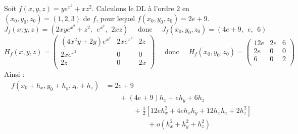 \begin{exemple}
Soit $f(x,y,z) = ye^{x^2} + xz^2$. Calculons le DL à l'ordre $2$ en $(x_0,y_0,z_0) = (1,2,3)$ de $f$, pour lequel $f(x_0,y_0,z_0) = 2e + 9$.
$$J_f (x,y,z) = \left(2xye^{x^2} + z^2,\ \  e^{x^2},\ \  2xz \right)
\quad \text{ donc } \quad
J_f (x_0,y_0,z_0) = \left(4e + 9,\ \  e,\ \ 6 \right)$$
$$H_f(x,y,z)=
\begin{pmatrix}
(4x^2y+2y) e^{x^2} & 2xe^{x^2} & 2z \\
2xe^{x^2} &  0 & 0\\
2z &  0 & 2x \\
\end{pmatrix}
\quad \text{ donc } \quad
H_f(x_0,y_0,z_0)=
\begin{pmatrix}
12e & 2e & 6 \\
2e &  0 & 0\\
6 &  0 & 2\\
\end{pmatrix}$$
Ainsi :
\begin{align*}
f(x_0+h_x,y_0+h_y,z_0+h_z) 
& =2e + 9 \\
& \qquad +  (4e+9)h_x +  eh_y + 6h_z \\
& \qquad\qquad + \frac{1}{2}\left[ 12e h_x^2 + 4eh_xh_y +12h_xh_z +2h_z^2 \right] \\
& \qquad\qquad\qquad + o(h_x^2+h_y^2+h_z^2)
\end{align*}

\end{exemple}

%
%
%
%
 

